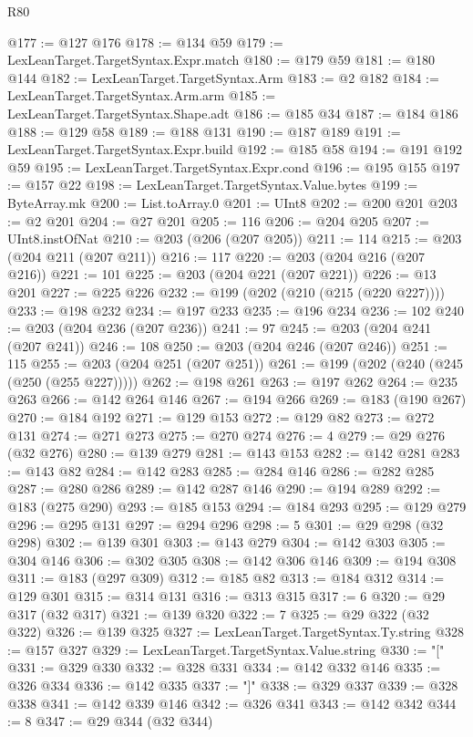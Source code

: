 \begin{lexlean}{R80}
\begin{coremodule}
@177 := @127 @176
@178 := @134 @59
@179 := LexLeanTarget.TargetSyntax.Expr.match
@180 := @179 @59
@181 := @180 @144
@182 := LexLeanTarget.TargetSyntax.Arm
@183 := @2 @182
@184 := LexLeanTarget.TargetSyntax.Arm.arm
@185 := LexLeanTarget.TargetSyntax.Shape.adt
@186 := @185 @34
@187 := @184 @186
@188 := @129 @58
@189 := @188 @131
@190 := @187 @189
@191 := LexLeanTarget.TargetSyntax.Expr.build
@192 := @185 @58
@194 := @191 @192 @59
@195 := LexLeanTarget.TargetSyntax.Expr.cond
@196 := @195 @155
@197 := @157 @22
@198 := LexLeanTarget.TargetSyntax.Value.bytes
@199 := ByteArray.mk
@200 := List.toArray.{0}
@201 := UInt8
@202 := @200 @201
@203 := @2 @201
@204 := @27 @201
@205 := 116
@206 := @204 @205
@207 := UInt8.instOfNat
@210 := @203 (@206 (@207 @205))
@211 := 114
@215 := @203 (@204 @211 (@207 @211))
@216 := 117
@220 := @203 (@204 @216 (@207 @216))
@221 := 101
@225 := @203 (@204 @221 (@207 @221))
@226 := @13 @201
@227 := @225 @226
@232 := @199 (@202 (@210 (@215 (@220 @227))))
@233 := @198 @232
@234 := @197 @233
@235 := @196 @234
@236 := 102
@240 := @203 (@204 @236 (@207 @236))
@241 := 97
@245 := @203 (@204 @241 (@207 @241))
@246 := 108
@250 := @203 (@204 @246 (@207 @246))
@251 := 115
@255 := @203 (@204 @251 (@207 @251))
@261 := @199 (@202 (@240 (@245 (@250 (@255 @227)))))
@262 := @198 @261
@263 := @197 @262
@264 := @235 @263
@266 := @142 @264 @146
@267 := @194 @266
@269 := @183 (@190 @267)
@270 := @184 @192
@271 := @129 @153
@272 := @129 @82
@273 := @272 @131
@274 := @271 @273
@275 := @270 @274
@276 := 4
@279 := @29 @276 (@32 @276)
@280 := @139 @279
@281 := @143 @153
@282 := @142 @281
@283 := @143 @82
@284 := @142 @283
@285 := @284 @146
@286 := @282 @285
@287 := @280 @286
@289 := @142 @287 @146
@290 := @194 @289
@292 := @183 (@275 @290)
@293 := @185 @153
@294 := @184 @293
@295 := @129 @279
@296 := @295 @131
@297 := @294 @296
@298 := 5
@301 := @29 @298 (@32 @298)
@302 := @139 @301
@303 := @143 @279
@304 := @142 @303
@305 := @304 @146
@306 := @302 @305
@308 := @142 @306 @146
@309 := @194 @308
@311 := @183 (@297 @309)
@312 := @185 @82
@313 := @184 @312
@314 := @129 @301
@315 := @314 @131
@316 := @313 @315
@317 := 6
@320 := @29 @317 (@32 @317)
@321 := @139 @320
@322 := 7
@325 := @29 @322 (@32 @322)
@326 := @139 @325
@327 := LexLeanTarget.TargetSyntax.Ty.string
@328 := @157 @327
@329 := LexLeanTarget.TargetSyntax.Value.string
@330 := "["
@331 := @329 @330
@332 := @328 @331
@334 := @142 @332 @146
@335 := @326 @334
@336 := @142 @335
@337 := "]"
@338 := @329 @337
@339 := @328 @338
@341 := @142 @339 @146
@342 := @326 @341
@343 := @142 @342
@344 := 8
@347 := @29 @344 (@32 @344)

\end{coremodule}
\end{lexlean}
